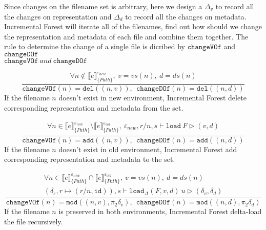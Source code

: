 \documentclass[10pt,twoside,a4paper]{article}
\theoremstyle{theorem}
\theoremstyle{lemma}
\theoremstyle{property}
\theoremstyle{definition}
\theoremstyle{assumption}
\def\snd{\pi_2}
\def\id{\mathtt{id}}
\begin{document}
Since changes on the filename set is arbitrary, here we design a $\Delta_v$ to record all the changes on representation and $\Delta_d$ to record all the changes on metadata. Incremental Forest will iterate all of the filenames, find out how should we change the representation and metadata of each file and combine them together. The rule to determine the change of a single file is dicribed by $\mathtt{changeVOf}$ and $\mathtt{changeDOf}$\\ 

$\boxed{\mathtt{changeVOf} ~ and ~ \mathtt{changeDOf}}$

\begin{displaymath}
	\frac
	{\forall n \not\in \llbracket e \rrbracket^{\varepsilon_{new}}_{\{Path\}},~ v = vs(n), ~d = ds(n)}
	{\mathtt{changeVOf}(n) = \mathtt{del}((n,v)), ~~\mathtt{changeDOf}(n) = \mathtt{del}((n,d))}
\end{displaymath}
If the filename $n$ doesn't exist in new environment, Incremental Forest delete corresponding representation and metadata from the set.

\begin{displaymath}
	\frac{\begin{array}{c}
	\forall n \in \llbracket e \rrbracket^{\varepsilon_{new}}_{\{Path\}} \setminus \llbracket e \rrbracket^{\varepsilon_{old}}_{\{Path\}}, ~ \varepsilon_{new}, r/n,s \vdash \mathtt{load}~F \rhd (v, d)
	\end{array}}
	{\mathtt{changeVOf}(n) = \mathtt{add}((n,v)), ~~\mathtt{changeDOf}(n) = \mathtt{add}((n,d))}
\end{displaymath}
If the filename $n$ doesn't exist in old environment, Incremental Forest add corresponding representation and metadata to the set.

\begin{displaymath}
	\frac{\begin{array}{c}
	\forall n \in \llbracket e \rrbracket^{\varepsilon_{new}}_{\{Path\}} \cap \llbracket e \rrbracket^{\varepsilon_{old}}_{\{Path\}}, ~ v = vs(n), ~d = ds(n)\\
	(\delta_\varepsilon, r \mapsto (r/n, \id)), s \vdash \mathtt{load}_\Delta (F,v,d)~ u \rhd (\delta_v,\delta_d)
	\end{array}}
	{\mathtt{changeVOf}(n) = \mathtt{mod}((n,v), \snd\delta_v), ~~\mathtt{changeDOf}(n) = \mathtt{mod}((n,d), \snd\delta_d)}
\end{displaymath}
If the filename $n$ is preserved in both environments, Incremental Forest delta-load the file recursively.
\end{document}
